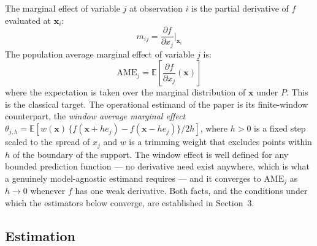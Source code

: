 \documentclass[12pt,a4paper]{article}
\numberwithin{equation}{section}
\theoremstyle{plain}
\theoremstyle{definition}
\begin{document}
	The marginal effect of variable $j$ at observation $i$ is the partial derivative of $f$ evaluated at $\mathbf{x}_i$:
	\begin{equation}
		m_{ij} = \frac{\partial f}{\partial x_j}\bigg|_{\mathbf{x}_i}
	\end{equation}
	The population average marginal effect of variable $j$ is:
	\begin{equation}
		\mathrm{AME}_j = \mathbb{E}\left[\frac{\partial f}{\partial x_j}(\mathbf{x})\right]
	\end{equation}
	where the expectation is taken over the marginal distribution of $\mathbf{x}$ under $P$. This is the classical target. The operational estimand of the paper is its finite-window counterpart, the \emph{window average marginal effect} $\theta_{j,h} = \mathbb{E}[w(\mathbf{x})\,\{f(\mathbf{x} + h e_j) - f(\mathbf{x} - h e_j)\}/2h]$, where $h > 0$ is a fixed step scaled to the spread of $x_j$ and $w$ is a trimming weight that excludes points within $h$ of the boundary of the support. The window effect is well defined for any bounded prediction function --- no derivative need exist anywhere, which is what a genuinely model-agnostic estimand requires --- and it converges to $\mathrm{AME}_j$ as $h \to 0$ whenever $f$ has one weak derivative. Both facts, and the conditions under which the estimators below converge, are established in Section~3.
	
	\subsection{Estimation}
	
\end{document}
